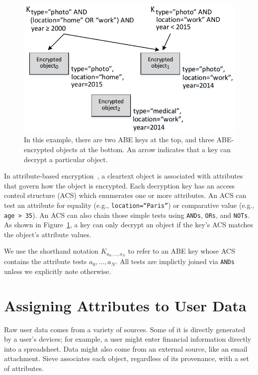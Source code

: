 \begin{figure}
  \centering
     \includegraphics{figs/abeExample.pdf}
     \caption[ABE Example]{In this example, there are two ABE keys at the
              top, and three ABE-encrypted objects at the bottom.
              An arrow indicates that a key can decrypt a particular
              object.}
  \label{fig:abeExample}
\end{figure}

In attribute-based encryption~\cite{kpabe}, a
cleartext object is associated with attributes
that govern how the object is encrypted. Each
decryption key has an access control structure
(ACS) which enumerates one or more attributes.
An ACS can test an attribute for equality (e.g.,
\texttt{location=``Paris''}) or comparative
value (e.g., \texttt{age > 35}). An ACS can
also chain those simple tests using \texttt{ANDs},
\texttt{ORs}, and \texttt{NOTs}. As shown in
Figure~\ref{fig:abeExample}, a key can only decrypt
an object if the key's ACS matches the object's
attribute values.

We use the shorthand notation $K_{a_0,\ldots,a_N}$
to refer to an ABE key whose ACS contains the
attribute tests $a_0,\ldots,a_N$. All tests are
implictly joined via \texttt{ANDs} unless we
explicitly note otherwise.

\section{Assigning Attributes to User Data}
\label{sec:attrGen}

Raw user data comes from a variety of
sources. Some of it is directly generated
by a user's devices; for example, a user
might enter financial information directly into a
spreadsheet. Data might also come from an
external source, like an email attachment.
Sieve associates each object, regardless
of its provenance, with a set of attributes.

